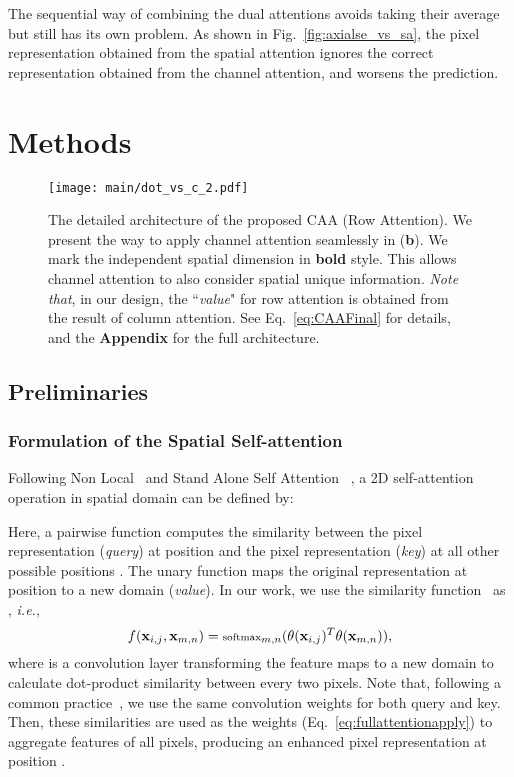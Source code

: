 \documentclass[letterpaper]{article} \usepackage{aaai22}  \usepackage{times}  \usepackage{helvet}  \usepackage{courier}  \usepackage[hyphens]{url}  \usepackage{graphicx} \urlstyle{rm} \def\UrlFont{\rm}  \usepackage{natbib}  \usepackage{caption} \DeclareCaptionStyle{ruled}{labelfont=normalfont,labelsep=colon,strut=off} \frenchspacing  \setlength{\pdfpagewidth}{8.5in}  \setlength{\pdfpageheight}{11in}  \usepackage{algorithm}
\begin{document}
The sequential way of combining the dual attentions avoids taking their average but still has its own problem. 
As shown in Fig.~\ref{fig:axialse_vs_sa}, the pixel representation obtained from the spatial attention ignores the correct representation obtained from the channel attention, and worsens the prediction.




\section{Methods} \label {sectMethods}

\begin{figure*}[t]
	\centering
	\texttt{[image: main/dot\_vs\_c\_2.pdf]}
	\caption{The detailed architecture of the proposed CAA (Row Attention). We present the way to apply channel attention seamlessly in (\textbf{b}). We mark the independent spatial dimension in \textbf{bold} style. This allows channel attention to also consider spatial unique information. \textit{Note that}, in our design, the ``\textit{value}" for row attention is obtained from the result of column attention. See Eq.~\ref{eq:CAAFinal} for details, and the \textbf{Appendix} for the full architecture.
	}
	\label{figOverall}
\end{figure*}


\subsection {Preliminaries}
\subsubsection{Formulation of the Spatial Self-attention}
Following Non Local~\cite{cNonLocal} and Stand Alone Self Attention ~\cite{cStandAloneSelfAttention}, a 2D self-attention operation in spatial domain can be defined by:

Here, a pairwise function  computes the similarity between the pixel representation  (\textit{query}) at position  and the pixel representation  (\textit{key}) at all other possible positions .
The unary function  maps the original representation at position  to a new domain (\textit{value}). In our work, we use the similarity function~\cite{cNonLocal} as , \textit{i.e.},
\begin {equation}
\scriptsize
f( \mathbf{x}_{i,j}, \mathbf{x}_{m,n}) = \text{softmax}_{m,n}(\theta( \mathbf{x}_{i,j})^T \theta( \mathbf{x}_{m,n})),
\label{eq:fullattentionmap}
\end {equation}
where  is a  convolution layer transforming the feature maps  to a new domain to calculate dot-product similarity \cite{cNonLocal} between every two pixels. Note that, following a common practice~\cite{cSPYGR}, we use the same  convolution weights for both query and key. Then, these similarities are used as the weights (Eq.~\eqref{eq:fullattentionapply}) to aggregate features of all pixels, producing an enhanced pixel representation  at position . 
\end{document}
